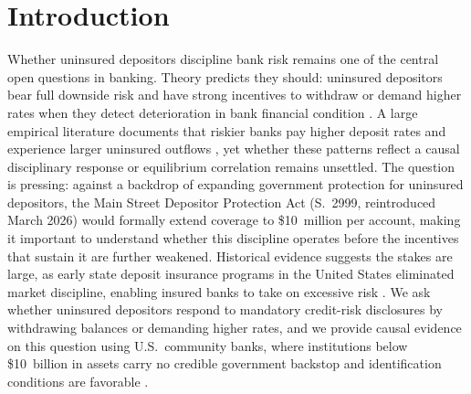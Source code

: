 
\section{Introduction}
\label{sec:intro}

Whether uninsured depositors discipline bank risk remains one of the central open
questions in banking.  Theory predicts they should: uninsured depositors bear
full downside risk and have strong incentives to withdraw or demand higher rates
when they detect deterioration in bank financial condition
\citep{calomiris1991role, diamond2001liquidity}.  A large empirical literature
documents that riskier banks pay higher deposit rates and experience larger
uninsured outflows \citep{park1995market, martinez2001depositors,
maechler2006dynamic, iyer2016tale, egan2017deposit, chen2024liquidity}, yet whether these patterns
reflect a causal disciplinary response or equilibrium correlation remains
unsettled.  The question is pressing: against a backdrop of expanding government
protection for uninsured depositors, the Main Street Depositor Protection Act
(S.~2999, reintroduced March 2026) would formally extend coverage to
\$10~million per account, making it important to understand whether this
discipline operates before the incentives that sustain it are further weakened. Historical
evidence suggests the stakes are large, as early state deposit insurance programs in the
United States eliminated market discipline, enabling insured banks to take on excessive
risk \citep{calomiris2019stealing}.
We ask whether uninsured depositors respond to mandatory credit-risk disclosures
by withdrawing balances or demanding higher rates, and we provide causal evidence
on this question using U.S.\ community banks, where institutions below
\$10~billion in assets carry no credible government backstop and identification
conditions are favorable \citep{o1990deposit, flannery1996evidence}.

